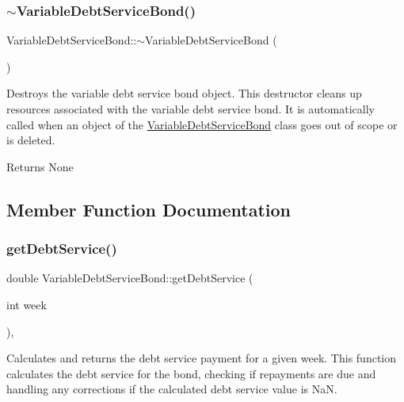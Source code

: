 \subsubsection{\texorpdfstring{$\sim$\+Variable\+Debt\+Service\+Bond()}{~VariableDebtServiceBond()}}
{\footnotesize\ttfamily Variable\+Debt\+Service\+Bond\+::$\sim$\+Variable\+Debt\+Service\+Bond (\begin{DoxyParamCaption}{ }\end{DoxyParamCaption})\hspace{0.3cm}{\ttfamily [override]}}



Destroys the variable debt service bond object. This destructor cleans up resources associated with the variable debt service bond. It is automatically called when an object of the {\ttfamily \mbox{\hyperlink{classVariableDebtServiceBond}{Variable\+Debt\+Service\+Bond}}} class goes out of scope or is deleted. 

\begin{DoxyReturn}{Returns}
None 
\end{DoxyReturn}


\subsection{Member Function Documentation}
\mbox{\label{classVariableDebtServiceBond_a575a9a41df38e005ba0a1cff3eb2b921}} 
\subsubsection{\texorpdfstring{get\+Debt\+Service()}{getDebtService()}}
{\footnotesize\ttfamily double Variable\+Debt\+Service\+Bond\+::get\+Debt\+Service (\begin{DoxyParamCaption}\item[{int}]{week }\end{DoxyParamCaption})\hspace{0.3cm}{\ttfamily [override]}, {\ttfamily [virtual]}}



Calculates and returns the debt service payment for a given week. This function calculates the debt service for the bond, checking if repayments are due and handling any corrections if the calculated debt service value is NaN. 


